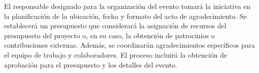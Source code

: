 \documentclass[
11pt, %
]{charter}
\begin{document}
El responsable designado para la organización del evento tomará la iniciativa en la planificación de la ubicación, fecha y formato del acto de agradecimiento. Se establecerá un presupuesto que considerará la asignación de recursos del presupuesto del proyecto o, en su caso, la obtención de patrocinios o contribuciones externas. Además, se coordinarán agradecimientos específicos para el equipo de trabajo y colaboradores. El proceso incluirá la obtención de aprobación para el presupuesto y los detalles del evento.
\end{document}
